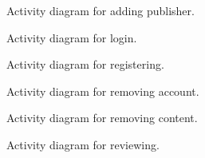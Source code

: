 
\begin{figure}[H]
\begin{center}	

	\caption{Activity diagram for adding publisher.}
	\label{dia_actvt_addpblshr}

\end{center}
\end{figure}

\begin{figure}[H]
\begin{center}	

	\caption{Activity diagram for login.}
	\label{dia_actvt_login}

\end{center}
\end{figure}

\begin{figure}[H]
\begin{center}	

	\caption{Activity diagram for registering.}
	\label{dia_actvt_rgstr}

\end{center}
\end{figure}

\begin{figure}[H]
\begin{center}	

	\caption{Activity diagram for removing account.}
	\label{dia_actvt_rmvaccnt}

\end{center}
\end{figure}

\begin{figure}[H]
\begin{center}	

	\caption{Activity diagram for removing content.}
	\label{dia_actvt_rmvcntnt}

\end{center}
\end{figure}

\begin{figure}[H]
\begin{center}	

	\caption{Activity diagram for reviewing.}
	\label{dia_actvt_rvw}

\end{center}
\end{figure}

